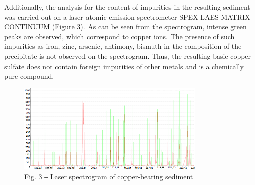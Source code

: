 \begin{multicols}{2}
Additionally, the analysis for the content of impurities in the
resulting sediment was carried out on a laser atomic emission
spectrometer SPEX LAES MATRIX CONTINUUM (Figure 3). As can be seen from
the spectrogram, intense green peaks are observed, which correspond to
copper ions. The presence of such impurities as iron, zinc, arsenic,
antimony, bismuth in the composition of the precipitate is not observed
on the spectrogram. Thus, the resulting basic copper sulfate does not
contain foreign impurities of other metals and is a chemically pure
compound.
\end{multicols}

\begin{figure}[H]
	\centering
	\includegraphics[width=0.8\textwidth]{media/chem2/image19}
	\caption*{Fig. 3 ‒ Laser spectrogram of copper-bearing sediment}
\end{figure}

